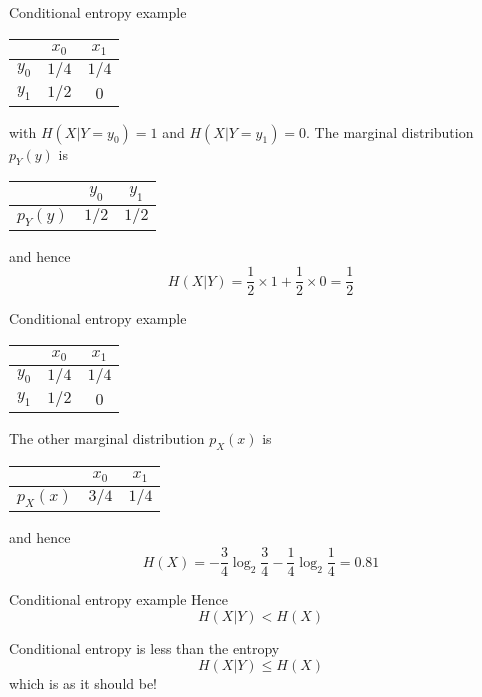 \documentclass{beamer}
\newcommand{\crish}{\color{reddish}}
\newcommand{\cbla}{\color{black}}
\newcommand{\sm}{\color{reddish}$}
\newcommand{\fm}{$\color{black}{}}
\begin{document}
\begin{frame}{Conditional entropy example}
\begin{center}
\color{purple}
    \begin{tabular}{c|cc}
&$x_0$&$x_1$\\
\hline
$y_0$&$1/4$&$1/4$\\
$y_1$&$1/2$&$0$
    \end{tabular}
    \color{black}
\end{center}
with \sm{}H(X|Y=y_0)=1\fm{} and \sm{}H(X|Y=y_1)=0\fm{}. The marginal distribution \sm{}p_Y(y)\fm{} is
\begin{center}
\color{purple}
    \begin{tabular}{c|cc}
  &$y_0$&$y_1$\\
\hline
$p_Y(y)$&$1/2$&$1/2$\\
    \end{tabular}
    \cbla
    \end{center}
and hence
\crish
$$
H(X|Y)=\frac{1}{2}\times 1 + \frac{1}{2}\times 0 =\frac{1}{2}
$$
\cbla
\end{frame}

\begin{frame}{Conditional entropy example}

\begin{center}
\color{purple}
    \begin{tabular}{c|cc}
&$x_0$&$x_1$\\
\hline
$y_0$&$1/4$&$1/4$\\
$y_1$&$1/2$&$0$
    \end{tabular}
    \color{black}
\end{center}
The other marginal distribution \sm{}p_X(x)\fm{} is
\begin{center}
\color{purple}
    \begin{tabular}{c|cc}
  &$x_0$&$x_1$\\
\hline
$p_X(x)$&$3/4$&$1/4$\\
    \end{tabular}
    \cbla
\end{center}
and hence
\crish
$$
H(X)=-\frac{3}{4}\log_2{\frac{3}{4}}-\frac{1}{4}\log_2{\frac{1}{4}}=0.81
$$
\cbla
\end{frame}


\begin{frame}{Conditional entropy example}
Hence
\crish
$$
H(X|Y)< H(X)
$$
\cbla
\end{frame}


\begin{frame}{Conditional entropy is less than the entropy}
\crish
$$
H(X|Y) \le H(X) 
$$
\cbla
which is as it should be!
\end{frame}
\end{document}
